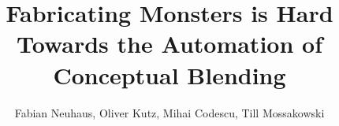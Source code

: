 \documentclass{ecai2012}
\begin{document}
\title{Fabricating Monsters is Hard\\ \LARGE Towards the Automation of Conceptual Blending}


\author{Fabian Neuhaus, Oliver Kutz, Mihai Codescu, Till Mossakowski
}



\maketitle
\end{document}
